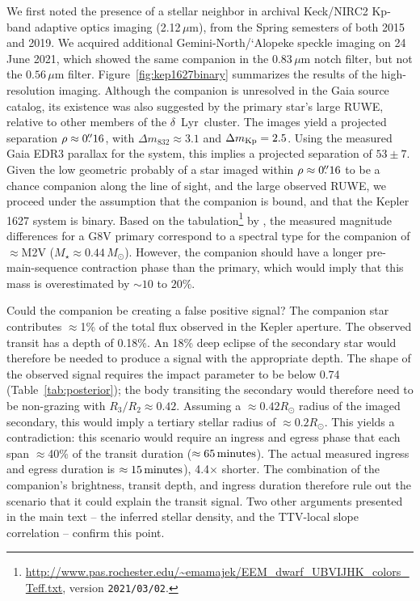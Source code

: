 \documentclass[12pt,modern,twocolumn,tighten]{aastex63}
\newcommand{\cn}{$\delta$\ Lyr\ cluster} %
\begin{document}
We first noted the presence of a stellar neighbor in archival
Keck/NIRC2 Kp-band adaptive optics imaging (2.12\,$\mu $m), from the
Spring semesters of both 2015 and 2019.  We acquired additional
Gemini-North/`Alopeke speckle imaging on 24 June 2021, which showed
the same companion in the 0.83\,$\mu$m notch filter, but not the
$0.56\,\mu$m filter.  Figure~\ref{fig:kep1627binary} summarizes the
results of the high-resolution imaging.  Although the companion is
unresolved in the Gaia source catalog, its existence was also
suggested by the primary star's large RUWE, relative to other members
of the \cn.  The images yield a projected separation $\rho \approx
0\mbox{$.\!\!^{\prime\prime}$}16$, with $\Delta m_{832} \approx 3.1$ and $\Delta m_{\rm Kp} =
2.5$.  Using the measured Gaia EDR3 parallax for the system, this
implies a projected separation of $53 \pm 7$.  Given the low geometric
probably of a star imaged within $\rho \approx 0\mbox{$.\!\!^{\prime\prime}$}16$ to be a
chance companion along the line of sight, and the large observed RUWE,
we proceed under the assumption that the companion is bound, and that
the Kepler\,1627 system is binary.  Based on the
tabulation\footnote{\url{http://www.pas.rochester.edu/~emamajek/EEM_dwarf_UBVIJHK_colors_Teff.txt},
version \texttt{2021/03/02}.} by \citet{pecaut_mamajek_2013}, the
measured magnitude differences for a G8V primary correspond to a
spectral type for the companion of $\approx$M2V ($M_\star \approx
0.44\,M_\odot$).  However, the companion should have a longer
pre-main-sequence contraction phase than the primary, which would
imply that this mass is overestimated by $\sim10$ to $20\%$.

Could the companion be creating a false positive signal?  The
companion star contributes $\approx$1\% of the total flux observed in
the Kepler aperture.  The observed transit has a depth of 0.18\%.  An
18\% deep eclipse of the secondary star would therefore be needed to
produce a signal with the appropriate depth.  The shape of the
observed signal requires the impact parameter to be below 0.74
(Table~\ref{tab:posterior}); the body transiting the secondary would
therefore need to be non-grazing with $R_3/R_2 \approx 0.42$.
Assuming a $\approx 0.42R_\odot$ radius of the imaged secondary, this
would imply a tertiary stellar radius of $\approx 0.2R_\odot$.  This
yields a contradiction:  this scenario would require an ingress and
egress phase that each span $\approx$40\% of the transit duration
($\approx 65\,{\rm minutes}$).  The actual measured ingress and egress
duration is $\approx 15\,{\rm minutes}$), 4.4$\times$ shorter.  The
combination of the companion's brightness, transit depth, and ingress
duration therefore rule out the scenario that it could explain the
transit signal.
Two other arguments presented in the main text -- the inferred stellar
density, and the TTV-local slope correlation -- confirm this point.
\end{document}
